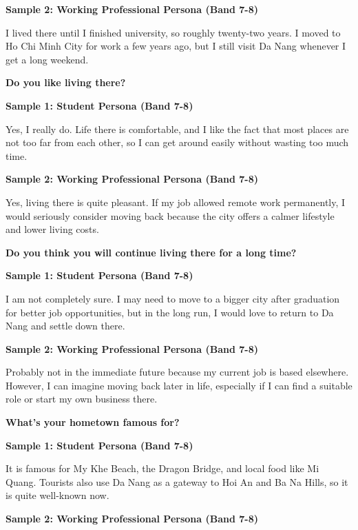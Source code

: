 \textbf{Sample 2: Working Professional Persona (Band 7-8)}

I lived there until I finished university, so roughly twenty-two years. I moved to Ho Chi Minh City for work a few years ago, but I still visit Da Nang whenever I get a long weekend.

\separator

\begin{ieltsquestion}
\textbf{Do you like living there?}
\end{ieltsquestion}
\textbf{Sample 1: Student Persona (Band 7-8)}

Yes, I really do. Life there is comfortable, and I like the fact that most places are not too far from each other, so I can get around easily without wasting too much time.

\textbf{Sample 2: Working Professional Persona (Band 7-8)}

Yes, living there is quite pleasant. If my job allowed remote work permanently, I would seriously consider moving back because the city offers a calmer lifestyle and lower living costs.

\separator

\begin{ieltsquestion}
\textbf{Do you think you will continue living there for a long time?}
\end{ieltsquestion}
\textbf{Sample 1: Student Persona (Band 7-8)}

I am not completely sure. I may need to move to a bigger city after graduation for better job opportunities, but in the long run, I would love to return to Da Nang and settle down there.

\textbf{Sample 2: Working Professional Persona (Band 7-8)}

Probably not in the immediate future because my current job is based elsewhere. However, I can imagine moving back later in life, especially if I can find a suitable role or start my own business there.

\separator

\begin{ieltsquestion}
\textbf{What's your hometown famous for?}
\end{ieltsquestion}
\textbf{Sample 1: Student Persona (Band 7-8)}

It is famous for My Khe Beach, the Dragon Bridge, and local food like Mi Quang. Tourists also use Da Nang as a gateway to Hoi An and Ba Na Hills, so it is quite well-known now.

\textbf{Sample 2: Working Professional Persona (Band 7-8)}

